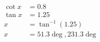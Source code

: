 \documentclass{article}
\begin{document}
\begin{equation}
\begin{aligned}
\cot x &= 0.8 \\
\tan x &= 1.25 \\
x &= \tan^{-1} (1.25) \\
x &= 51.3 \deg,  231.3 \deg
\end{aligned}
\end{equation}
\end{document}
